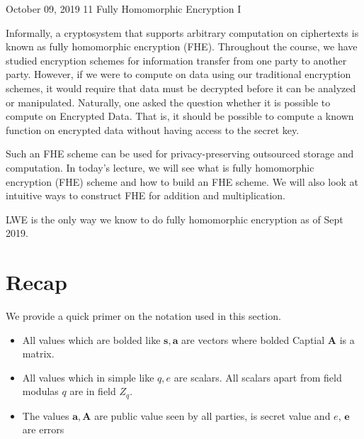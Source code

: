 \documentclass[usletter]{article}
\begin{document}
    
           {October 09, 2019}                          %
           {11}                                       %
           {Fully Homomorphic Encryption I}  %

\newcommand{\floor}[1]{\left\lfloor #1 \right\rfloor}
\newcommand{\ceil}[1]{\left\lceil #1 \right\rceil}

Informally, a cryptosystem that supports arbitrary computation on ciphertexts is known as fully homomorphic encryption (FHE)\cite{wiki}. Throughout the course, we have studied encryption schemes for information transfer from one party to another party. However, if we were to compute on data using our traditional encryption schemes, it would require that data must be decrypted before it can be analyzed or manipulated. Naturally, one asked the question whether it is possible to compute on Encrypted Data. That is, it should be possible to compute a known function on encrypted data without having access to the secret key. 

Such an FHE scheme can be used for privacy-preserving outsourced storage and computation. In today's lecture, we will see what is fully homomorphic encryption (FHE) scheme and how to build an FHE scheme. We will also look at intuitive ways to construct FHE for addition and multiplication.

\begin{fact}
LWE is the only way we know to do fully homomorphic encryption as of Sept 2019. 
\end{fact}
           
\section{Recap}

We provide a quick primer on the notation used in this section. 
\begin{itemize}
    \item All values which are bolded like $\pmb{s}, \pmb{a}$ are vectors where bolded Captial $\pmb{A}$ is a matrix.
    \item All values which in simple like $q, e$ are scalars. All scalars apart from field modulas $q$ are in field $Z_q$.
    \item The values $\pmb{a}, \pmb{A}$ are public value seen by all parties,  is secret value and $e$, $\pmb{e}$ are errors
\end{itemize}
\end{document}
